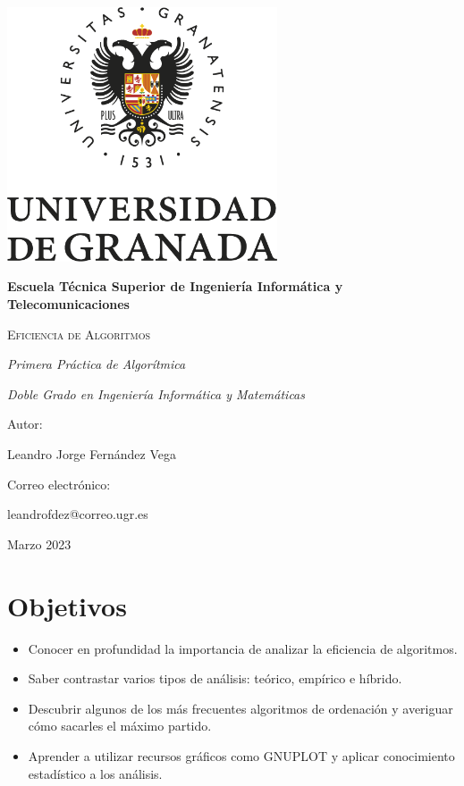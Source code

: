 \documentclass[a4paper,12pt,twoside]{article} %
\begin{document}
\begin{titlepage}
\centering

{\includegraphics[width=0.6\textwidth]{foto_portada.png}\par}
\vspace{1cm}

{\bfseries\LARGE Escuela Técnica Superior de Ingeniería Informática y Telecomunicaciones \par}
\vspace{0.5cm}

{\scshape\Huge Eficiencia de Algoritmos \par}
\vspace{0.5cm}

{\itshape\Large Primera Práctica de Algorítmica \par}
\vfill
{\itshape\Large Doble Grado en Ingeniería Informática y Matemáticas \par}
\vfill

{\Large Autor: \par}
{\Large Leandro Jorge Fernández Vega \par}
\vspace{0.5cm}
{\Large Correo electrónico:}
{\Large leandrofdez@correo.ugr.es \par}
\vfill

{\Large Marzo 2023 \par}

\end{titlepage}

\tableofcontents
\newpage


\section{Objetivos}


	\begin{itemize}
		\item Conocer en profundidad la importancia de analizar la eficiencia de algoritmos.
		\item Saber contrastar varios tipos de análisis: teórico, empírico e híbrido.
		\item Descubrir algunos de los más frecuentes algoritmos de ordenación y averiguar cómo sacarles el máximo partido.
		\item Aprender a utilizar recursos gráficos como GNUPLOT y aplicar conocimiento estadístico a los análisis.
	\end{itemize}
\newpage
\end{document}

